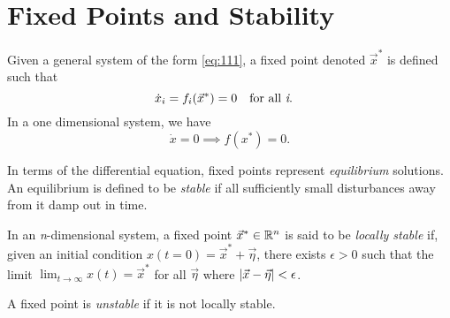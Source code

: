 \documentclass[oneside]{book}
\begin{document}
\section{Fixed Points and Stability}
\begin{definition} 
	Given a general system of the form \eqref{eq:111}, a fixed point denoted $ \vec{x}^* $ is defined such that
	\[
		\dot{x}_i = f_i (\vec{x}^*) = 0 \qq{for all \textit{i}.}
	\]
	In a one dimensional system, we have
	\[
	\dot{x} = 0 \implies f(x^*) = 0.
	\]
\end{definition}
In terms of the differential equation, fixed points represent \textit{equilibrium} solutions. An equilibrium is defined to be \textit{stable} if all sufficiently small disturbances away from it damp out in time. 
\begin{definition}
	In an \textit{n}-dimensional system, a fixed point $ \vec{x}^* \in \mathbb{R}^n$ is said to be \textit{locally stable} if, given an initial condition $ x(t=0) = \vec{x}^* + \vec{\eta} $, there exists $ \epsilon > 0 $ such that the limit $ \displaystyle\lim_{t \to \infty} x(t) = \vec{x}^* $ for all $ \vec{\eta} $ where $ \abs{\vec{x} - \vec{\eta}} < \epsilon $.
\end{definition}
\begin{definition}
	A fixed point is \textit{unstable} if it is not locally stable.
\end{definition}
\noindent{}
\end{document}
